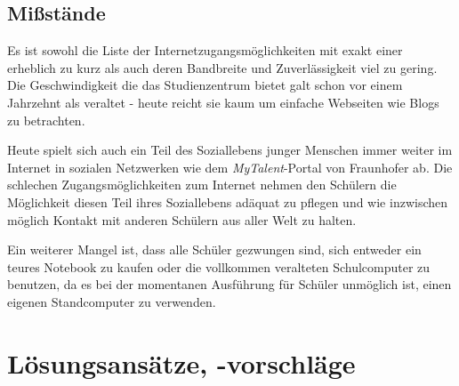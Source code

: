 \documentclass[10pt,a4paper,notitlepage]{scrartcl}
\begin{document}
\subsection{Mißstände}
\begin{multicols}{2}
Es ist sowohl die Liste der Internetzugangsmöglichkeiten mit exakt einer erheblich zu kurz als auch deren Bandbreite und Zuverlässigkeit viel zu gering. Die Geschwindigkeit die das Studienzentrum bietet galt schon vor einem Jahrzehnt als veraltet - heute reicht sie kaum um einfache Webseiten wie Blogs zu betrachten.

Heute spielt sich auch ein Teil des Soziallebens junger Menschen immer weiter im Internet in sozialen Netzwerken wie dem \emph{MyTalent}-Portal von Fraunhofer ab. Die schlechen Zugangsmöglichkeiten zum Internet nehmen den Schülern die Möglichkeit diesen Teil ihres Soziallebens adäquat zu pflegen und wie inzwischen möglich Kontakt mit anderen Schülern aus aller Welt zu halten.

Ein weiterer Mangel ist, dass alle Schüler gezwungen sind, sich entweder ein teures Notebook zu kaufen oder die vollkommen veralteten Schulcomputer zu benutzen, da es bei der momentanen Ausführung für Schüler unmöglich ist, einen eigenen Standcomputer zu verwenden.
\end{multicols}
%
%
\section{Lösungsansätze, -vorschläge}
\end{document}
